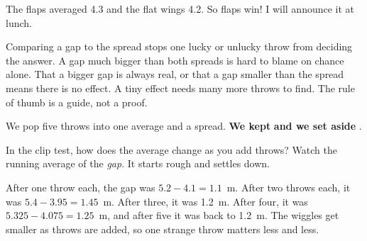 \begin{multix}[hmm]\multixbot[hmm]\tcblower
The flaps averaged 4.3 and the flat wings 4.2. So flaps win! I will announce it at lunch.
\end{multix}

{Comparing a gap to the spread stops one lucky or unlucky throw from deciding the answer. A gap much bigger than both spreads is hard to blame on chance alone.}
{That a bigger gap is always real, or that a gap smaller than the spread means there is no effect. A tiny effect needs many more throws to find. The rule of thumb is a guide, not a proof.}

\begin{keepbox}
We pop five throws into one average and a spread. \textbf{We kept} \wline[3.4cm] \textbf{and we set aside} \wline[3.4cm].
\end{keepbox}

\clearpage

In the clip test, how does the average change as you add throws? Watch the running average of the \emph{gap}. It starts rough and settles down.

\begin{center}
\end{center}

After one throw each, the gap was $5.2-4.1=1.1$~m. After two throws each, it was $5.4-3.95=1.45$~m. After three, it was 1.2~m. After four, it was $5.325-4.075=1.25$~m, and after five it was back to 1.2~m. The wiggles get smaller as throws are added, so one strange throw matters less and less.

